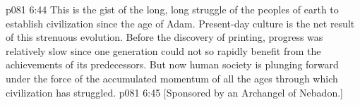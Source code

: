 \pc \vs p081 6:44 This is the gist of the long, long struggle of the peoples of earth to establish civilization since the age of Adam. Present\hyp{}day culture is the net result of this strenuous evolution. Before the discovery of printing, progress was relatively slow since one generation could not so rapidly benefit from the achievements of its predecessors. But now human society is plunging forward under the force of the accumulated momentum of all the ages through which civilization has struggled.
\vsetoff
\vs p081 6:45 [Sponsored by an Archangel of Nebadon.]
